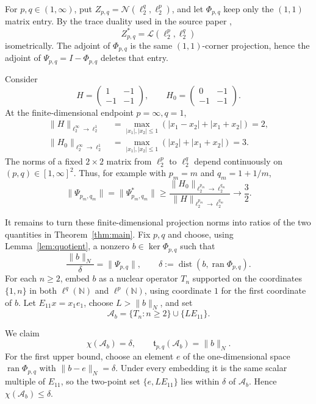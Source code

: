 \documentclass[11pt]{article}
\newcommand{\Nuc}{\mathcal N}
\newcommand{\Tail}{\mathfrak t}
\newcommand{\dist}{\operatorname{dist}}
\begin{document}
For \(p,q\in(1,\infty)\), put
\(Z_{p,q}=\Nuc(\ell^q_2,\ell^p_2)\), and let \(\Phi_{p,q}\) keep only the
\((1,1)\) matrix entry.  By the trace duality used in the source paper
\cite[Proposition~3.1(a)]{HK},
\[
 Z_{p,q}^*=\mathcal L(\ell^p_2,\ell^q_2)
\]
isometrically.  The adjoint of \(\Phi_{p,q}\) is the same \((1,1)\)-corner
projection, hence the adjoint of \(\Psi_{p,q}=I-\Phi_{p,q}\) deletes that
entry.

Consider
\[
 H=\begin{pmatrix}1&-1\\-1&-1\end{pmatrix},\qquad
 H_0=\begin{pmatrix}0&-1\\-1&-1\end{pmatrix}.
\]
At the finite-dimensional endpoint \(p=\infty,q=1\),
\begin{align*}
 \|H\|_{\ell^\infty_2\to\ell^1_2}
 &=\max_{|x_1|,|x_2|\le1}
    (|x_1-x_2|+|x_1+x_2|)=2,\\
 \|H_0\|_{\ell^\infty_2\to\ell^1_2}
 &=\max_{|x_1|,|x_2|\le1}
    (|x_2|+|x_1+x_2|)=3.
\end{align*}
The norms of a fixed \(2\times2\) matrix from \(\ell^p_2\) to \(\ell^q_2\)
depend continuously on \((p,q)\in[1,\infty]^2\).  Thus, for example with
\(p_m=m\) and \(q_m=1+1/m\),
\begin{equation}\label{eq:dual-limit}
 \|\Psi_{p_m,q_m}\|
 =\|\Psi_{p_m,q_m}^*\|
 \ge
 \frac{\|H_0\|_{\ell^{p_m}_2\to\ell^{q_m}_2}}
      {\|H\|_{\ell^{p_m}_2\to\ell^{q_m}_2}}
 \longrightarrow \frac32.
\end{equation}

It remains to turn these finite-dimensional projection norms into ratios of
the two quantities in Theorem~\ref{thm:main}.  Fix \(p,q\) and choose, using
Lemma~\ref{lem:quotient}, a nonzero \(b\in\ker\Phi_{p,q}\) such that
\begin{equation}\label{eq:b}
 \frac{\|b\|_N}{\delta}=\|\Psi_{p,q}\|,
 \qquad
 \delta:=\dist(b,\operatorname{ran}\Phi_{p,q}).
\end{equation}
For each \(n\ge2\), embed \(b\) as a nuclear operator \(T_n\) supported on
the coordinates \(\{1,n\}\) in both \(\ell^q(\mathbb N)\) and
\(\ell^p(\mathbb N)\), using coordinate \(1\) for the first coordinate of
\(b\).  Let \(E_{11}x=x_1e_1\), choose \(L>\|b\|_N\), and set
\[
 \mathcal A_b=\{T_n:n\ge2\}\cup\{LE_{11}\}.
\]

We claim
\begin{equation}\label{eq:two-equalities}
 \chi(\mathcal A_b)=\delta,
 \qquad
 \Tail_{p,q}(\mathcal A_b)=\|b\|_N.
\end{equation}
For the first upper bound, choose an element \(e\) of the one-dimensional
space \(\operatorname{ran}\Phi_{p,q}\) with \(\|b-e\|_N=\delta\).  Under
every embedding it is the same scalar multiple of \(E_{11}\), so the
two-point set \(\{e,LE_{11}\}\) lies within \(\delta\) of \(\mathcal A_b\).
Hence \(\chi(\mathcal A_b)\le\delta\).
\end{document}
